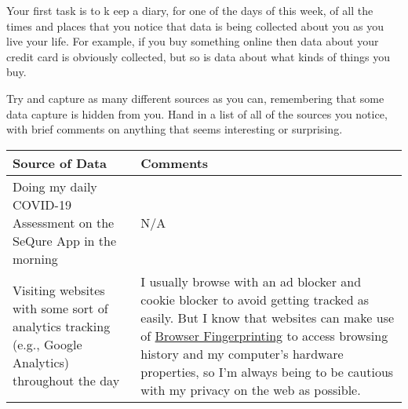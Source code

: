 \documentclass[
  coursecode={CSIC/CMPE 251},
  assignmentname={Exercise 1},
  studentnumber=20053722,
  name={Bryan Hoang}
]{
  ltxanswer%
}
\begin{document}
  \begin{questions}
    \question[2]{}
    Your first task is to k eep a diary, for one of the days of this week, of all the times and places that you notice that data is being collected about you as you live your life. For example, if you buy something online then data about your credit card is obviously collected, but so is data about what kinds of things you buy.

    Try and capture as many different sources as you can, remembering that some data capture is hidden from you. Hand in a list of all of the sources you notice, with brief comments on anything that seems interesting or surprising.
    \begin{solution}
      \captionsetup{type=table}
      \begin{center}
        \label{tab:1}
        \begin{tabularx}{\textwidth}{
            >{\raggedright\arraybackslash}X
            >{\raggedright\arraybackslash}X}
          Source of Data                                                                                                                                  & Comments                                                                                                                                                                                                                                                                                                                                                                              \\
          \toprule
          Doing my daily COVID-19 Assessment on the SeQure App in the morning                                                                             & N/A                                                                                                                                                                                                                                                                                                                                                                                   \\
          \midrule
          Visiting websites with some sort of analytics tracking (e.g., Google Analytics) throughout the day                                              & I usually browse with an ad blocker and cookie blocker to avoid getting tracked as easily. But I know that websites can make use of \href{https://en.wikipedia.org/wiki/Device_fingerprint\#Browser_fingerprint}{Browser Fingerprinting} to access browsing history and my computer's hardware properties, so I'm always being to be cautious with my privacy on the web as possible. \\

\end{tabularx}
\end{center}
\end{solution}
\end{questions}
\end{document}

